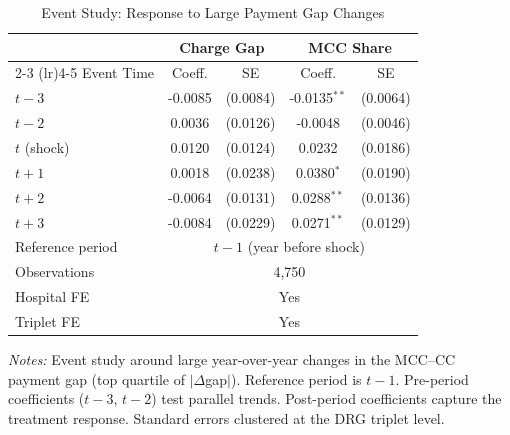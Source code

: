 \begin{table}[htbp]
\centering
\caption{Event Study: Response to Large Payment Gap Changes}
\label{tab:eventstudy}
\begin{tabular}{lcccc}
\hline\hline
 & \multicolumn{2}{c}{Charge Gap} & \multicolumn{2}{c}{MCC Share} \\
\cmidrule(lr){2-3} \cmidrule(lr){4-5}
Event Time & Coeff. & SE & Coeff. & SE \\
\hline
$t-3$ & -0.0085 & (0.0084) & -0.0135$^{**}$ & (0.0064) \\
$t-2$ & 0.0036 & (0.0126) & -0.0048 & (0.0046) \\
$t$ (shock) & 0.0120 & (0.0124) & 0.0232 & (0.0186) \\
$t+1$ & 0.0018 & (0.0238) & 0.0380$^{*}$ & (0.0190) \\
$t+2$ & -0.0064 & (0.0131) & 0.0288$^{**}$ & (0.0136) \\
$t+3$ & -0.0084 & (0.0229) & 0.0271$^{**}$ & (0.0129) \\
\hline
Reference period & \multicolumn{4}{c}{$t-1$ (year before shock)} \\
Observations & \multicolumn{4}{c}{4,750} \\
Hospital FE & \multicolumn{4}{c}{Yes} \\
Triplet FE & \multicolumn{4}{c}{Yes} \\
\hline\hline
\end{tabular}
\begin{tablenotes}[flushleft]\small
\item \textit{Notes:} Event study around large year-over-year changes in the MCC--CC payment gap (top quartile of $|\Delta$gap$|$). Reference period is $t-1$. Pre-period coefficients ($t-3$, $t-2$) test parallel trends. Post-period coefficients capture the treatment response. Standard errors clustered at the DRG triplet level.
\end{tablenotes}
\end{table}

